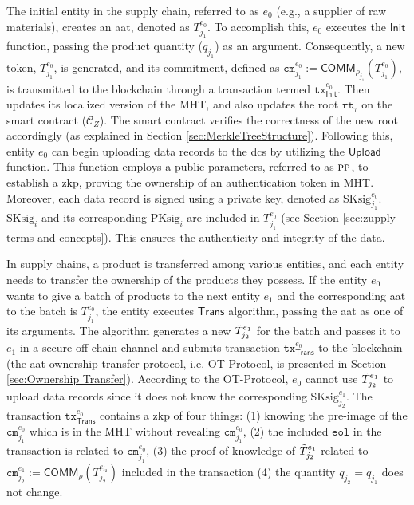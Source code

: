 The initial entity in the supply chain, referred to as $e_{0}$ (e.g., a supplier of raw materials), creates an \gls{aat}, denoted as $T^{e_{0}}_{j_1}$. To accomplish this, $e_{0}$ executes the $\mathsf{Init}$ function, passing the product quantity ($q_{j_1}$) as an argument. Consequently, a new token, $T^{e_{0}}_{j_1}$, is generated, and its commitment, defined as $\texttt{cm}^{e_{0}}_{j_1} := \mathsf{COMM}_{\rho_{j_1}}(T^{e_{0}}_{j_1})$, is transmitted to the blockchain through a transaction termed $\texttt{tx}^{e_{0}}_\mathsf{Init}$. Then updates its localized version of the \textsf{MHT}, and also updates the root $\texttt{rt}_\tau$ on the smart contract ($\mathcal{C}_Z$). The smart contract verifies the correctness of the new root accordingly (as explained in Section \ref{sec:MerkleTreeStructure}). Following this, entity $e_0$ can begin uploading data records to the \gls{dcs} by utilizing the $\mathsf{Upload}$ function. This function employs a public parameters, referred to as $\textsc{pp}$, to establish a \gls{zkp}, proving the ownership of an authentication token in \textsf{MHT}. Moreover, each data record is signed using a private key, denoted as \( \text{SKsig}^{e_{0}}_{{j_1}} \). $\text{SKsig}_{i}$ and its corresponding $\text{PKsig}_{i}$ are included in \( T^{e_{0}}_{j_1} \) (see Section \ref{sec:zupply-terms-and-concepts}). This ensures the authenticity and integrity of the data.



In supply chains, a product is transferred among various entities, and each entity needs to transfer the ownership of the products they possess. If the entity $e_{0}$ wants to give a batch of products to the next entity $e_{1}$ and the corresponding \gls{aat} to the batch is $T^{e_{0}}_{j_1}$, the entity executes $\mathsf{Trans}$ algorithm, passing the \gls{aat} as one of its arguments. The algorithm generates a new $\Tilde{T}^{e_{1}}_{j_2}$ for the batch and passes it to $e_{1}$ in a secure off chain channel and submits transaction $\texttt{tx}^{e_{0}}_\mathsf{Trans}$ to the blockchain (the \gls{aat} ownership transfer protocol, i.e. \textsf{OT-Protocol}, is presented in Section \ref{sec:Ownership Transfer}). According to the \textsf{OT-Protocol}, $e_{0}$ cannot use $\Tilde{T}^{e_{1}}_{j_2}$ to upload data records since it does not know the corresponding $\text{SKsig}^{e_{1}}_{j_2}$. The transaction $\texttt{tx}^{e_{0}}_\mathsf{Trans}$ contains a \gls{zkp} of four things: (1) knowing the pre-image of the $\texttt{cm}_{j_1}^{e_{0}}$ which is in the \textsf{MHT} without revealing $\texttt{cm}_{j_1}^{e_{0}}$, (2) the included $\texttt{eol}$ in the transaction is related to  $\texttt{cm}_{j_1}^{e_{0}}$, (3) the proof of knowledge of $\Tilde{T}^{e_{1}}_{j_2}$ related to $\texttt{cm}^{e_{1}}_{j_2} := \mathsf{COMM}_\rho(T^{e_{i_2}}_{j_2})$ included in the transaction (4) the quantity $q_{j_2}=q_{j_1}$ does not change.

